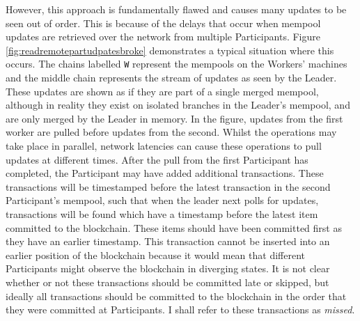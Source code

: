 \documentclass[12pt,a4paper,twoside,openright]{report}
\begin{document}
	However, this approach is fundamentally flawed and causes many updates to be seen out of order. 
	This is because of the delays that occur when mempool updates are retrieved over the network from multiple Participants.
	Figure \ref{fig:readremotepartudpatesbroke} demonstrates a typical situation where this occurs.
	The chains labelled \texttt{W} represent the mempools on the Workers' machines and the middle chain represents the stream of updates as seen by the Leader. These updates are shown as if they are part of a single merged mempool, although in reality they exist on isolated branches in the Leader's mempool, and are only merged by the Leader in memory.
	In the figure, updates from the first worker are pulled before updates from the second.
	Whilst the operations may take place in parallel, network latencies can cause these operations to pull updates at different times.
	After the pull from the first Participant has completed, the Participant may have added additional transactions. 
	These transactions will be timestamped before the latest transaction in the second Participant's mempool, such that when the leader next polls for updates, transactions will be found which have a timestamp before the latest item committed to the blockchain.
	These items should have been committed first as they have an earlier timestamp.
	This transaction cannot be inserted into an earlier position of the blockchain because it would mean that different Participants might observe the blockchain in diverging states.
	It is not clear whether or not these transactions should be committed late or skipped, but ideally all transactions should be committed to the blockchain in the order that they were committed at Participants.
	I shall refer to these transactions as \textit{missed}.
\end{document}
